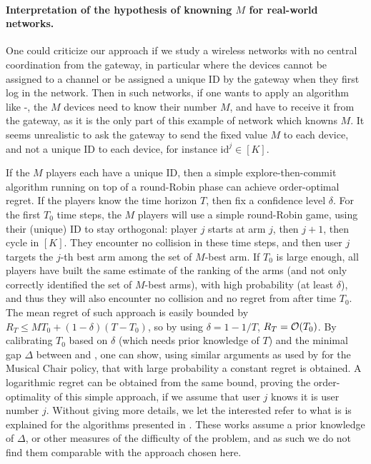 \paragraph{Interpretation of the hypothesis of knowning $M$ for real-world networks.}
\label{par:5:knowingYourIDinMPBanditsGame}
%
One could criticize our approach if we study a wireless networks with no central coordination from the gateway,
in particular where the devices cannot be assigned to a channel or be assigned a unique ID by the gateway when they first log in the network.
Then in such networks, if one wants to apply an algorithm like \MCTopM-\klUCB,
the $M$ devices need to know their number $M$, and have to receive it from the gateway, as it is the only part of this example of network which knowns $M$.
It seems unrealistic to ask the gateway to send the fixed value $M$ to each device, and not a unique ID to each device, for instance $\mathrm{id}^j\in[K]$.


If the $M$ players each have a unique ID, then a simple explore-then-commit algorithm running on top of a round-Robin phase can achieve order-optimal regret.
If the players know the time horizon $T$, then fix a confidence level $\delta$. For the first $T_0$ time steps, the $M$ players will use a simple round-Robin game, using their (unique) ID to stay orthogonal: player $j$ starts at arm $j$, then $j+1$, then cycle in $[K]$. They encounter no collision in these time steps, and then user $j$ targets the $j$-th best arm among the set of $M$-best arm.
If $T_0$ is large enough, all players have built the same estimate of the ranking of the arms (and not only correctly identified the set of $M$-best arms), with high probability (at least $\delta$), and thus they will also encounter no collision and no regret from after time $T_0$.
The mean regret of such approach is easily bounded by $R_T \leq M T_0 + (1 - \delta) (T - T_0)$, so by using $\delta = 1-1/T$, $R_T = \mathop{}\mathopen{}\mathcal{O}\mathopen{}\left(T_0\right)$.
By calibrating $T_0$ based on $\delta$ (which needs prior knowledge of $T$) and the minimal gap $\Delta$ between \Mbest{} and \Mworst, one can show, using similar arguments as used by \cite{Rosenski16} for the Musical Chair policy, that with large probability a constant regret is obtained. A logarithmic regret can be obtained from the same bound, proving the order-optimality of this simple approach, if we assume that user $j$ knows it is user number $j$.
%
Without giving more details, we let the interested refer to what is is explained for the algorithms presented in \cite{DarakHanawal18,JoshiKumar2018,KumarDarak2019}.
%
These works assume a prior knowledge of $\Delta$, or other measures of the difficulty of the problem, and as such we do not find them comparable with the approach chosen here.


